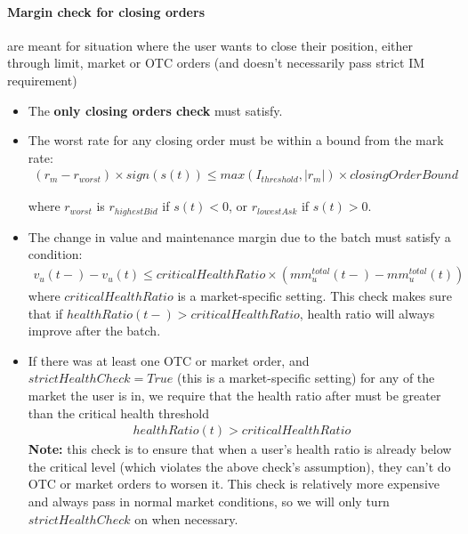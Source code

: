 \documentclass{article}%
\begin{document}
\paragraph{Margin check for closing orders} are meant for situation where the user wants to close their position, either through limit, market or OTC orders (and doesn't necessarily pass strict IM requirement)
\begin{itemize}
    \item The \textbf{only closing orders check} must satisfy.
    \item The worst rate for any closing order must be within a bound from the mark rate:
    \begin{align*}
        (r_m - r_{worst}) \times sign(s(t)) \leq max(I_{threshold}, |r_m|) \times closingOrderBound
    \end{align*}
    
    where $r_{worst}$ is $r_{highestBid}$ if $s(t) < 0$, or $r_{lowestAsk}$ if $s(t) > 0$.

    \item The change in value and maintenance margin due to the batch must satisfy a condition:
    \begin{align*}
        v_u(t-) - v_u(t) \leq criticalHealthRatio \times (mm_u^{total}(t-) - mm_u^{total}(t))
    \end{align*}
    where $criticalHealthRatio$ is a market-specific setting. This check makes sure that if $healthRatio(t-) > criticalHealthRatio$, health ratio will always improve after the batch.
    
    \item If there was at least one OTC or market order, and $strictHealthCheck = True$ (this is a market-specific setting) for any of the market the user is in, we require that the health ratio after must be greater than the critical health threshold
    \begin{align*}
        healthRatio(t) > criticalHealthRatio
    \end{align*}
    \textbf{Note:} this check is to ensure that when a user's health ratio is already below the critical level (which violates the above check's assumption), they can't do OTC or market orders to worsen it. This check is relatively more expensive and always pass in normal market conditions, so we will only turn $strictHealthCheck$ on when necessary.
\end{itemize}
\end{document}
